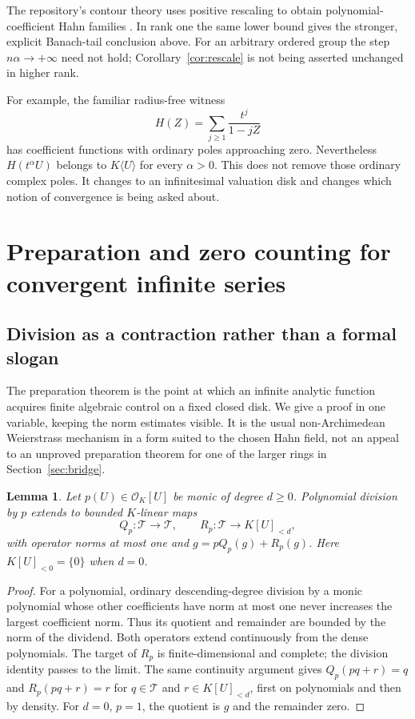 \documentclass[11pt,a4paper]{article}
\numberwithin{equation}{section}
\newtheorem{lemma}[theorem]{Lemma}
\theoremstyle{definition}
\theoremstyle{remark}
\newcommand{\OO}{\mathcal O}
\newcommand{\TT}{\mathcal T}
\begin{document}
The repository's contour theory uses positive rescaling to obtain
polynomial-coefficient Hahn families \cite{RepoContours}. In rank one the
same lower bound gives the stronger, explicit Banach-tail conclusion above.
For an arbitrary ordered group the step $n\alpha\to+\infty$ need not hold;
Corollary~\ref{cor:rescale} is not being asserted unchanged in higher rank.

For example, the familiar radius-free witness
\[
 H(Z)=\sum_{j\ge1}\frac{t^j}{1-jZ}
\]
has coefficient functions with ordinary poles approaching zero. Nevertheless
$H(t^\alpha U)$ belongs to $K\langle U\rangle$ for every $\alpha>0$.
This does not remove those ordinary complex poles. It changes to an
infinitesimal valuation disk and changes which notion of convergence is being
asked about.

\section{Preparation and zero counting for convergent infinite series}
\label{sec:preparation}

\subsection{Division as a contraction rather than a formal slogan}
The preparation theorem is the point at which an infinite analytic function
acquires finite algebraic control on a fixed closed disk. We give a proof in one
variable, keeping the norm estimates visible. It is the usual non-Archimedean
Weierstrass mechanism in a form suited to the chosen Hahn field, not an appeal
to an unproved preparation theorem for one of the larger rings in
Section~\ref{sec:bridge}.

\begin{lemma}\label{lem:polydivision}
Let $p(U)\in\OO_K[U]$ be monic of degree $d\ge0$. Polynomial division by
$p$ extends to bounded $K$-linear maps
\[
 Q_p:\TT\longrightarrow\TT,\qquad
 R_p:\TT\longrightarrow K[U]_{<d},
\]
with operator norms at most one and
$g=pQ_p(g)+R_p(g)$. Here $K[U]_{<0}=\{0\}$ when $d=0$.
\end{lemma}
\begin{proof}
For a polynomial, ordinary descending-degree division by a monic polynomial
whose other coefficients have norm at most one never increases the largest
coefficient norm. Thus its quotient and remainder are bounded by the norm of
the dividend. Both operators extend continuously from the dense polynomials.
The target of $R_p$ is finite-dimensional and complete; the division identity
passes to the limit. The same continuity argument gives
$Q_p(pq+r)=q$ and $R_p(pq+r)=r$ for $q\in\TT$ and
$r\in K[U]_{<d}$, first on polynomials and then by density.
For $d=0$, $p=1$, the quotient is $g$ and the remainder
zero.
\end{proof}
\end{document}
